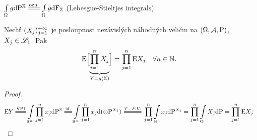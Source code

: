 \begin{remark}
	$\int\limits_{\Omega}g\dif\PEX\equal{\text{ozn.}}\int\limits_{\Omega}g\dif\FEX$ (Lebesgue-Stieltjes integrals)
\end{remark}
\begin{theorem}
	Nechť $(X_j)_{j=1}^{+\infty}$ je posloupnost nezávislých náhodných veličin na $(\Omega,\mathcal{A},\mathrm{P})$, \newline $X_j\in\mathscr{L}_1$. Pak \[
	\mathrm{E} \Bigl[\underbrace{\prod\limits_{j=1}^n X_j}_{Y=g(\mathbb{X})}\Bigr] =\prod\limits_{j=1}^n \mathrm{E} X_j~~~\forall n\in\mathbb{N}.
	\]
	\begin{proof}
		$$ \E Y\equal{\text{VPI}}\int\limits_{\R^n}\prod\limits_{j=1}^n x_j \dif\PEX \equal{\text{id.}}\int\limits_{\R^n}\prod\limits_{j=1}^nx_j\dif(\otimes \PP^{X_j})\equal{T-F.V.}\prod\limits_{j=1}^n \int\limits_{\R}x_j\dif \PP^{X_j}=\prod\limits_{j=1}^n \int\limits_{\Omega}X_j\dif \PP=\prod\limits_{j=1}^n \E X_j $$
	\end{proof}
\end{theorem}


